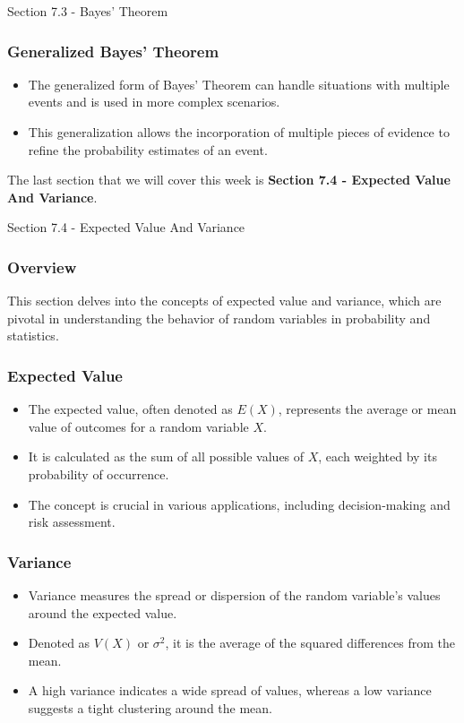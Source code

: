 \begin{notes}{Section 7.3 - Bayes' Theorem}
    \subsubsection*{Generalized Bayes' Theorem}
    \begin{itemize}
        \item The generalized form of Bayes' Theorem can handle situations with multiple events and is used in more complex scenarios.
        \item This generalization allows the incorporation of multiple pieces of evidence to refine the probability estimates of an event.
    \end{itemize}
\end{notes}

The last section that we will cover this week is \textbf{Section 7.4 - Expected Value And Variance}.

\begin{notes}{Section 7.4 - Expected Value And Variance}
    \subsubsection*{Overview}
    This section delves into the concepts of expected value and variance, which are pivotal in understanding the behavior of random variables in probability and statistics. \vspace*{1em}

    \subsubsection*{Expected Value}
    \begin{itemize}
        \item The expected value, often denoted as $E(X)$, represents the average or mean value of outcomes for a random variable $X$. 
        \item It is calculated as the sum of all possible values of $X$, each weighted by its probability of occurrence.
        \item The concept is crucial in various applications, including decision-making and risk assessment.
    \end{itemize}

    \subsubsection*{Variance}
    \begin{itemize}
        \item Variance measures the spread or dispersion of the random variable's values around the expected value. 
        \item Denoted as $V(X)$ or $\sigma^2$, it is the average of the squared differences from the mean.
        \item A high variance indicates a wide spread of values, whereas a low variance suggests a tight clustering around the mean.
    \end{itemize}
\end{notes}